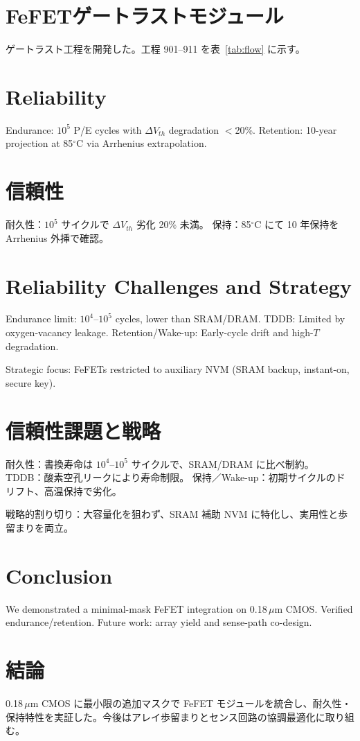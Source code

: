\documentclass[journal]{IEEEtran}
\begin{document}
\section*{FeFETゲートラストモジュール}
ゲートラスト工程を開発した。工程 901–911 を表~\ref{tab:flow} に示す。

\section{Reliability}
Endurance: $10^5$ P/E cycles with $\Delta V_{th}$ degradation $<$20\%.  
Retention: 10-year projection at 85$^\circ$C via Arrhenius extrapolation.  

\section*{信頼性}
耐久性：$10^5$ サイクルで $\Delta V_{th}$ 劣化 20\% 未満。  
保持：85$^\circ$C にて 10 年保持を Arrhenius 外挿で確認。

\section{Reliability Challenges and Strategy}
Endurance limit: $10^4$–$10^5$ cycles, lower than SRAM/DRAM.  
TDDB: Limited by oxygen-vacancy leakage.  
Retention/Wake-up: Early-cycle drift and high-$T$ degradation.  

Strategic focus: FeFETs restricted to auxiliary NVM (SRAM backup, instant-on, secure key).  

\section*{信頼性課題と戦略}
耐久性：書換寿命は $10^4$–$10^5$ サイクルで、SRAM/DRAM に比べ制約。  
TDDB：酸素空孔リークにより寿命制限。  
保持／Wake-up：初期サイクルのドリフト、高温保持で劣化。  

戦略的割り切り：大容量化を狙わず、SRAM 補助 NVM に特化し、実用性と歩留まりを両立。

\section{Conclusion}
We demonstrated a minimal-mask FeFET integration on 0.18\,$\mu$m CMOS. Verified endurance/retention. Future work: array yield and sense-path co-design.

\section*{結論}
0.18\,$\mu$m CMOS に最小限の追加マスクで FeFET モジュールを統合し、耐久性・保持特性を実証した。今後はアレイ歩留まりとセンス回路の協調最適化に取り組む。



\end{document}

